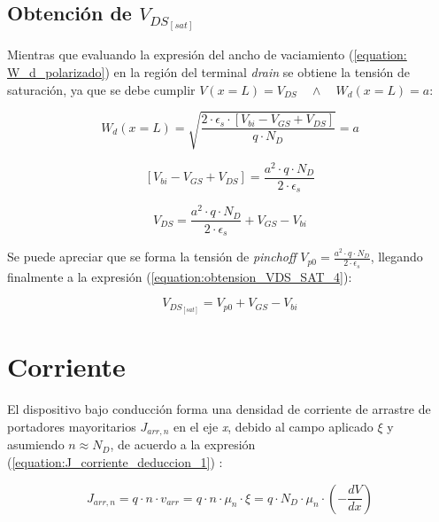 \documentclass[a4paper]{article}
\begin{document}
\subsection{Obtención de $V_{DS_{[sat]}}$}
Mientras que evaluando la expresión del ancho de vaciamiento (\ref{equation: W_d_polarizado}) en la región del terminal \textit{drain} se obtiene la tensión de saturación, ya que se debe cumplir $V(x = L ) = V_{DS} \quad \wedge \quad W_d(x = L ) = a$:

\begin{equation}\label{equation:obtension_VDS_SAT}
	W_d(x = L ) = \sqrt{\frac{2 \cdot \epsilon_s \cdot [  V_{bi} - V_{GS} + V_{DS }] }{q\cdot N_D}} = a 
\end{equation} 

\begin{equation}\label{equation:obtension_VDS_SAT_2}
	 [  V_{bi} - V_{GS} + V_{DS }]  = \frac{a^2 \cdot q\cdot N_D}{2 \cdot \epsilon_s}
\end{equation} 

\begin{equation}\label{equation:obtension_VDS_SAT_3}
	 V_{DS}  = \frac{a^2 \cdot q\cdot N_D}{2 \cdot \epsilon_s} + V_{GS} -  V_{bi}
\end{equation} 

Se puede apreciar que se forma la tensión de \textit{pinchoff} $ V_{p0}= \frac{a^2 \cdot q\cdot N_D}{2 \cdot \epsilon_s}$, llegando finalmente a la expresión (\ref{equation:obtension_VDS_SAT_4}):

\begin{equation}\label{equation:obtension_VDS_SAT_4}
	V_{DS_{[sat]}} = V_{p0} + V_{GS} -  V_{bi}
\end{equation} 


\section{Corriente}
\label{sec:modelo_completo}

El dispositivo bajo conducción forma una densidad de corriente de arrastre de portadores mayoritarios $J_{arr, n} $ en el eje \textit{x}, debido al campo aplicado $\xi$ y asumiendo $ n \approx N_D$, de acuerdo a la expresión (\ref{equation:J_corriente_deduccion_1}) :

\begin{equation}\label{equation:J_corriente_deduccion_1}
	J_{arr, n} = q\cdot n\cdot 	v_{arr}  =q \cdot n \cdot \mu_n \cdot \xi  =  q \cdot N_D \cdot \mu_n \cdot (- \frac{dV}{dx})
\end{equation}
\end{document}
